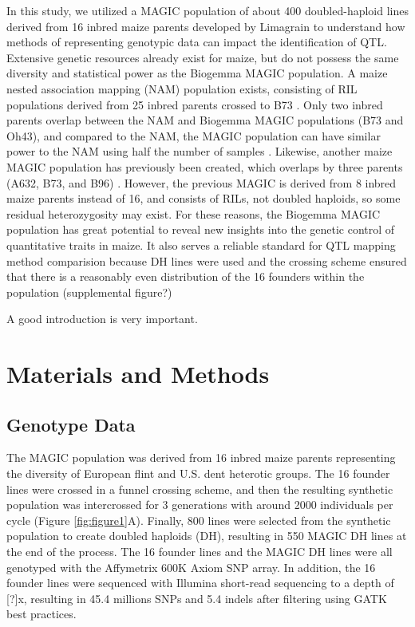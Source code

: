 \documentclass[article,9pt,twocolumn,twoside]{rilabRxiv}
\begin{document}
In this study, we utilized a MAGIC population of about 400 doubled-haploid lines derived from 16 inbred maize parents developed by Limagrain to understand how methods of representing genotypic data can impact the identification of QTL. Extensive genetic resources already exist for maize, but do not possess the same diversity and statistical power as the Biogemma MAGIC population. A maize nested association mapping (NAM) population exists, consisting of RIL populations derived from 25 inbred parents crossed to B73 \citep{RN75}.  Only two inbred parents overlap between the NAM and Biogemma MAGIC populations (B73 and Oh43), and compared to the NAM, the MAGIC population can have similar power to the NAM using half the number of samples \citep{RN65}. Likewise, another maize MAGIC population has previously been created, which overlaps by three parents (A632, B73, and B96) \citep{RN65}. However, the previous MAGIC is derived from 8 inbred maize parents instead of 16, and consists of RILs, not doubled haploids, so some residual heterozygosity may exist.  For these reasons, the Biogemma MAGIC population has great potential to reveal new insights into the genetic control of quantitative traits in maize. It also serves a reliable standard for QTL mapping method comparision because DH lines were used and the crossing scheme ensured that there is a reasonably even distribution of the 16 founders within the population (supplemental figure?)

\lettrine[lines=2]{\color{color2}A}{} good introduction is very important.
\section{Materials and Methods}
\label{sec:materials:methods}
\subsection{Genotype Data}
The MAGIC population was derived from 16 inbred maize parents representing the
 diversity of European flint and U.S. dent heterotic groups. The 16 founder
  lines were crossed in a funnel crossing scheme, and then the resulting
   synthetic population was intercrossed for 3 generations with around 2000
    individuals per cycle (Figure \ref{fig:figure1}A). Finally, 800 lines were selected from the synthetic
     population to create doubled haploids (DH), resulting in 550 MAGIC DH
      lines at the end of the process. The 16 founder lines and the MAGIC DH
       lines were all genotyped with the Affymetrix 600K Axiom SNP array. In
       addition, the 16 founder lines were sequenced with Illumina short-read
       sequencing to a depth of [?]x, resulting in 45.4 millions SNPs and
       5.4 indels after filtering using GATK best practices.
\end{document}
